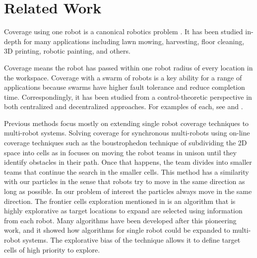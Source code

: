 
\section{Related Work}\label{sec:RelatedWork}

Coverage using one robot is a canonical robotics problem \cite{choset2001coverage}. It has been studied in-depth for many applications including lawn mowing, harvesting, floor cleaning, 3D printing, robotic painting, and others. 

Coverage means the robot has passed within one robot radius of every location in the workspace. Coverage with a swarm of robots is a key ability for a range of applications because swarms have higher fault tolerance and reduce completion time. Correspondingly, it has been studied from a control-theoretic perspective in  both centralized and decentralized approaches. For examples of each, see  \cite{zheng2005multi} and \cite{wagner1999distributed}.

Previous methods focus mostly on extending single robot coverage techniques to multi-robot systems. Solving coverage for synchronous multi-robots using on-line coverage techniques such as the boustrophedon technique of subdividing the 2D space into cells as in \cite{latimer2002towards} focuses on moving the robot teams in unison until they identify obstacles in their path. 
Once that happens, the team divides into smaller teams that continue the search in the smaller cells. 
This method has a similarity with our particles in the sense that robots try to move in the same direction as long as possible. 
In our problem of interest the particles always move in the same direction.  
The frontier cells exploration mentioned in \cite{yamauchi1998frontier} is an algorithm that is highly explorative as target locations to expand are selected using information from each robot.
 Many algorithms have been developed after this pioneering work, and it showed how algorithms for single robot could be expanded to multi-robot systems. 
 The explorative bias of the technique allows it to define target cells of high priority to explore.   

